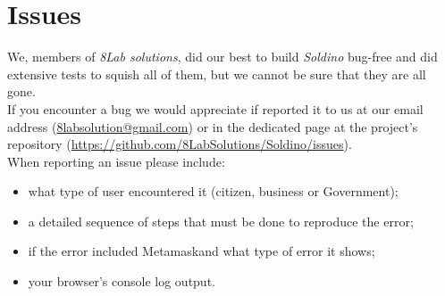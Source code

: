 \section{Issues}
We, members of \textit{8Lab solutions}, did our best to build \textit{Soldino} 
bug-free and did extensive tests to squish all of them, but we cannot be sure 
that they are all gone.\\
If you encounter a bug we would appreciate if reported it to us at our 
email address (\href{mailto:8labsolution@gmail.com}{8labsolution@gmail.com}) 
or in the dedicated page at the project's repository (\url{https://github.com/8LabSolutions/Soldino/issues}).
\\When reporting an issue please include:
\begin{itemize}
	\item what type of user encountered it (citizen, business or Government);
	\item a detailed sequence of steps that must be done to reproduce the error;
	\item if the error included Metamask\glosp and what type of error it shows;
	\item your browser's console log output.
\end{itemize}

